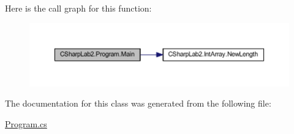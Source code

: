 Here is the call graph for this function\+:
\nopagebreak
\begin{figure}[H]
\begin{center}
\leavevmode
\includegraphics[width=350pt]{class_c_sharp_lab2_1_1_program_ad1384680a182efdc7cf9f8eb73540648_cgraph}
\end{center}
\end{figure}


The documentation for this class was generated from the following file\+:\begin{DoxyCompactItemize}
\item 
\hyperlink{_program_8cs}{Program.\+cs}\end{DoxyCompactItemize}
